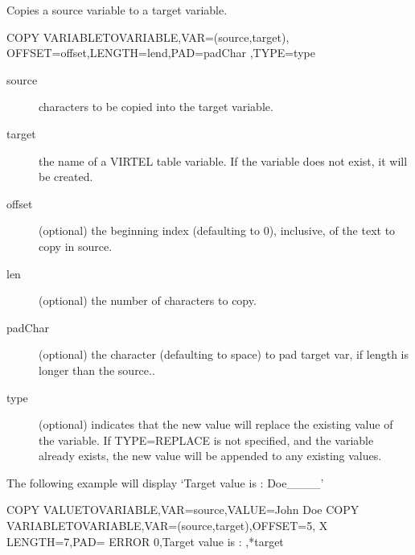 \documentclass[letterpaper,10pt,english]{sphinxmanual}
\begin{document}

Copies a source variable to a target variable.

\begin{sphinxVerbatim}[commandchars=\\\{\}]
COPY\PYGZdl{} VARIABLE\PYGZhy{}TO\PYGZhy{}VARIABLE,VAR=(\PYGZsq{}source\PYGZsq{},\PYGZsq{}target\PYGZsq{}),
      OFFSET=offset,LENGTH=lend,PAD=\PYGZsq{}padChar \PYGZsq{},TYPE=type
\end{sphinxVerbatim}
\begin{description}
\item[{source}] \leavevmode
characters to be copied into the target variable.

\item[{target}] \leavevmode
the name of a VIRTEL table variable. If the variable does not exist, it will be created.

\item[{offset}] \leavevmode
(optional) the beginning index (defaulting to 0), inclusive, of the text to copy in source.

\item[{len}] \leavevmode
(optional) the number of characters to copy.

\item[{padChar}] \leavevmode
(optional) the character (defaulting to space) to pad target var, if length is longer than the source..

\item[{type}] \leavevmode
(optional) indicates that the new value will replace the existing value of the variable. If TYPE=REPLACE is not specified, and the variable already exists, the new value will be appended to any existing values.

\end{description}

The following example will display ‘Target value is : Doe\_\_\_\_’

\begin{sphinxVerbatim}[commandchars=\\\{\}]
COPY\PYGZdl{} VALUE\PYGZhy{}TO\PYGZhy{}VARIABLE,VAR=\PYGZsq{}source\PYGZsq{},VALUE=\PYGZsq{}John Doe\PYGZsq{}
COPY\PYGZdl{} VARIABLE\PYGZhy{}TO\PYGZhy{}VARIABLE,VAR=(\PYGZsq{}source\PYGZsq{},\PYGZsq{}target\PYGZsq{}),OFFSET=5,                    X
        LENGTH=7,PAD=\PYGZsq{}\PYGZus{}\PYGZsq{}
ERROR\PYGZdl{} 0,\PYGZsq{}Target value is : \PYGZsq{},\PYGZsq{}*target\PYGZsq{}
\end{sphinxVerbatim}
\end{document}
